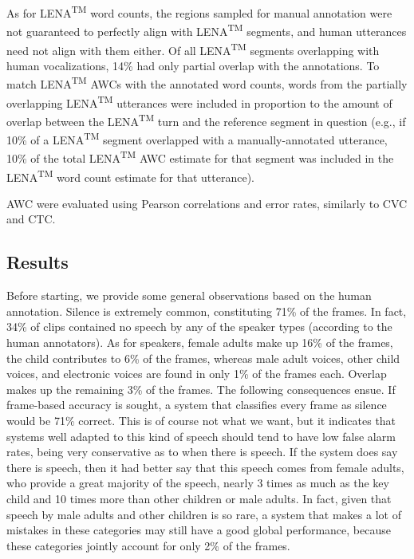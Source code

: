 \documentclass[english,table,man,floatsintext]{apa6}
\begin{document}
As for LENA\textsuperscript{TM} word counts, the regions sampled for manual annotation were not guaranteed to perfectly align with LENA\textsuperscript{TM} segments, and human utterances need not align with them either. Of all LENA\textsuperscript{TM} segments overlapping with human vocalizations, 14\% had only partial overlap with the annotations. To match LENA\textsuperscript{TM} AWCs with the annotated word counts, words from the partially overlapping LENA\textsuperscript{TM} utterances were included in proportion to the amount of overlap between the LENA\textsuperscript{TM} turn and the reference segment in question (e.g., if 10\% of a LENA\textsuperscript{TM} segment overlapped with a manually-annotated utterance, 10\% of the total LENA\textsuperscript{TM} AWC estimate for that segment was included in the LENA\textsuperscript{TM} word count estimate for that utterance).

AWC were evaluated using Pearson correlations and error rates, similarly to CVC and CTC.

\hypertarget{results}{%
\subsection{Results}\label{results}}

Before starting, we provide some general observations based on the human annotation. Silence is extremely common, constituting 71\% of the frames. In fact, 34\% of clips contained no speech by any of the speaker types (according to the human annotators). As for speakers, female adults make up 16\% of the frames, the child contributes to 6\% of the frames, whereas male adult voices, other child voices, and electronic voices are found in only 1\% of the frames each. Overlap makes up the remaining 3\% of the frames. The following consequences ensue. If frame-based accuracy is sought, a system that classifies every frame as silence would be 71\% correct. This is of course not what we want, but it indicates that systems well adapted to this kind of speech should tend to have low false alarm rates, being very conservative as to when there is speech. If the system does say there is speech, then it had better say that this speech comes from female adults, who provide a great majority of the speech, nearly 3 times as much as the key child and 10 times more than other children or male adults. In fact, given that speech by male adults and other children is so rare, a system that makes a lot of mistakes in these categories may still have a good global performance, because these categories jointly account for only 2\% of the frames.
\end{document}
